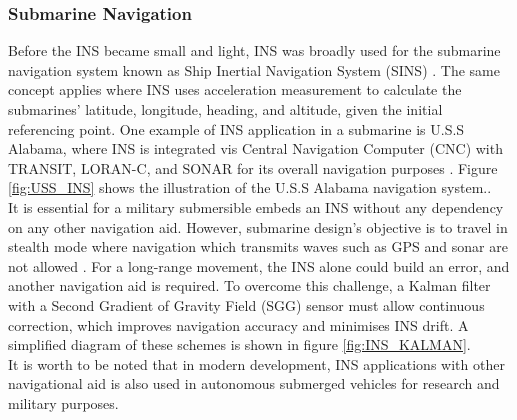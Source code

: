 \subsubsection{Submarine Navigation}
Before the INS became small and light, INS was broadly used for the submarine navigation system known as Ship Inertial Navigation System (SINS) \cite{NATOSINS}. The same concept applies where INS uses acceleration measurement to calculate the submarines' latitude, longitude, heading, and altitude, given the initial referencing point.  One example of INS application in a submarine is U.S.S Alabama, where INS is integrated vis Central Navigation Computer (CNC) with TRANSIT, LORAN-C, and SONAR for its overall navigation purposes \cite{HowNavigation}. Figure \ref{fig:USS_INS} shows the illustration of the U.S.S Alabama navigation system..\\

\noindent It is essential for a military submersible embeds an INS without any dependency on any other navigation aid. However, submarine design's objective is to travel in stealth mode where navigation which transmits waves such as GPS and sonar are not allowed \cite{Rogobete2018UsingPositioning}. For a long-range movement, the INS alone could build an error, and another navigation aid is required. To overcome this challenge, a Kalman filter with a Second Gradient of Gravity Field (SGG) sensor must allow continuous correction, which improves navigation accuracy and minimises INS drift. A simplified diagram of these schemes is shown in figure \ref{fig:INS_KALMAN}.\\

\noindent It is worth to be noted that in modern development, INS applications with other navigational aid is also used in autonomous submerged vehicles for research and military purposes.\\

